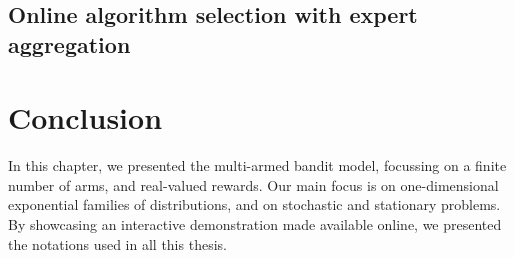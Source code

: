 






\subsection{Online algorithm selection with expert aggregation}





\newpage  %

\section{Conclusion}
\label{sec:2:conclusion}

In this chapter, we presented the multi-armed bandit model, focussing on a finite number of arms, and real-valued rewards.
Our main focus is on one-dimensional exponential families of distributions, and on stochastic and stationary problems.
By showcasing an interactive demonstration made available online,
we presented the notations used in all this thesis.

